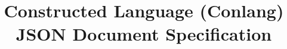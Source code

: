 \documentclass[letterpaper,12pt]{report}
\begin{document}
\title{Constructed Language (Conlang) JSON Document Specification}

\maketitle
\newpage
{}
\tableofcontents
\newpage
{}
\setcounter{page}{1}

\newpage
\printbibliography[
heading=bibintoc,
title={Bibliography}
]
\newpage
\end{document}
